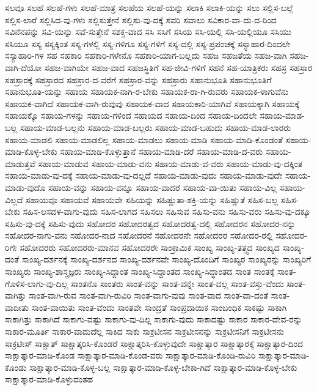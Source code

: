 {ಸಲವೂ
ಸಲಹೆ
ಸಲಹೆ-ಗಳು
ಸಲಹೆ-ಮಾತ್ರ
ಸಲಹೆಯ
ಸಲಹೆ-ಯನ್ನು
ಸಲಾಕಿ
ಸಲಾಕಿ-ಯನ್ನು
ಸಲು
ಸಲ್ಲಿಸ-ಬಲ್ಲೆ
ಸಲ್ಲಿಸ-ಲಾರೆ
ಸಲ್ಲಿಸಿದ-ವು-ಗಳು
ಸಲ್ಲಿಸುತ್ತೇನೆ
ಸಲ್ಲಿಸು-ವು-ದಕ್ಕೆ
ಸವರಿ
ಸವಾಲು
ಸವಿಕಾರ-ವಾ-ದು-ದ-ರಿಂದ
ಸವಿನೆನಪನ್ನು
ಸವಿ-ಯನ್ನು
ಸವೆ-ಸುತ್ತೇನೆ
ಸಶಕ್ತ-ವಾದ
ಸಸಿ
ಸಸಿಗೆ
ಸಸಿಯ
ಸಸಿ-ಯಲ್ಲಿ
ಸಸಿ-ಯಲ್ಲಿಯೂ
ಸಸಿಯು
ಸಸಿಯೂ
ಸಸ್ಯ
ಸಸ್ಯಕ್ಕಿಂತ
ಸಸ್ಯ-ಗಳಲ್ಲಿ
ಸಸ್ಯ-ಗಳಿಗೂ
ಸಸ್ಯ-ಗಳಿಗೆ
ಸಸ್ಯ-ದಲ್ಲಿ
ಸಸ್ಯ-ಪ್ರಪಂಚಕ್ಕೆ
ಸಸ್ಯಾಹಾರ-ದಿಂದಲೇ
ಸಸ್ಯಾಹಾರಿ-ಗಳ
ಸಹ
ಸಹಕಾರಿ
ಸಹಕಾರಿ-ಗಳೇನೊ
ಸಹಕಾರಿ-ಯಾಗ-ಬಲ್ಲದು
ಸಹಜ
ಸಹಜತೆಯ
ಸಹಜ-ವಾಗಿ
ಸಹಜ-ವಾಗಿ-ದೆಯೋ
ಸಹಜ-ವಾಗಿಯೇ
ಸಹಜ-ವಾದ
ಸಹಜಸ್ಥಿತಿಗೆ
ಸಹ-ಜೀವಿ-ಗಳಿಗೆ
ಸಹನೆ
ಸಹ-ಯಾತ್ರಿಕರು
ಸಹಸ್ರ
ಸಹಸ್ರಾರ
ಸಹಸ್ರಾರಕ್ಕೆ
ಸಹಸ್ರಾರದ
ಸಹಸ್ರಾರ-ದ-ವರೆಗೆ
ಸಹಸ್ರಾರ-ವನ್ನು
ಸಹಸ್ರಾರು
ಸಹಾನುಭೂತಿ
ಸಹಾನುಭೂತಿಗೆ
ಸಹಾನುಭೂತಿ-ಯನ್ನು
ಸಹಾಯ
ಸಹಾಯಕ-ನಾಗಿ-ರ-ಬೇಕು
ಸಹಾಯಕ-ರಾ-ಗಿ-ರುವರು
ಸಹಾಯಕ-ಳಾಗುವೆನು
ಸಹಾಯಕ-ವಾಗಿದೆ
ಸಹಾಯಕ-ವಾಗಿ-ರುವುವು
ಸಹಾಯಕ-ವಾದ
ಸಹಾಯಕಾರಿ-ಯಾಗಿವೆ
ಸಹಾಯಕ್ಕಾಗಿ
ಸಹಾಯಕ್ಕೆ
ಸಹಾಯಕ್ಕೊ
ಸಹಾಯ-ಗಳನ್ನು
ಸಹಾಯ-ಗಳಿಂದ
ಸಹಾಯದ
ಸಹಾಯ-ದಿಂದ
ಸಹಾಯ-ದಿಂದಲೇ
ಸಹಾಯ-ಮಾಡ-ಬಲ್ಲ
ಸಹಾಯ-ಮಾಡ-ಬಲ್ಲನು
ಸಹಾಯ-ಮಾಡ-ಬಲ್ಲರು
ಸಹಾಯ-ಮಾಡ-ಬಹುದು
ಸಹಾಯ-ಮಾಡ-ಲಾರರು
ಸಹಾಯ-ಮಾಡಲಿ
ಸಹಾಯ-ಮಾಡಲಿಲ್ಲ
ಸಹಾಯ-ಮಾಡಲು
ಸಹಾಯ-ಮಾಡಿ
ಸಹಾಯ-ಮಾಡಿ-ಕೊಂಡಂತೆ
ಸಹಾಯ-ಮಾಡಿ-ಕೊಳ್ಳ-ಬೇಕು
ಸಹಾಯ-ಮಾಡಿ-ಕೊಳ್ಳುತ್ತಾನೆ
ಸಹಾಯ-ಮಾಡಿ-ದರೆ
ಸಹಾಯ-ಮಾಡಿ-ದ-ವರು
ಸಹಾಯ-ಮಾಡುತ್ತವೆ
ಸಹಾಯ-ಮಾಡುವ
ಸಹಾಯ-ಮಾಡು-ವನು
ಸಹಾಯ-ಮಾಡು-ವ-ವರು
ಸಹಾಯ-ಮಾಡು-ವು-ದಕ್ಕಿಂತ
ಸಹಾಯ-ಮಾಡು-ವು-ದಕ್ಕೆ
ಸಹಾಯ-ಮಾಡು-ವು-ದಲ್ಲದೆ
ಸಹಾಯ-ಮಾಡು-ವುದು
ಸಹಾಯ-ಮಾಡು-ವುದೇ
ಸಹಾಯ-ಮಾಡು-ವುದೊ
ಸಹಾಯ-ವನ್ನು
ಸಹಾಯ-ವನ್ನೂ
ಸಹಾಯ-ವಾದರೆ
ಸಹಾಯ-ವಾ-ಯಿತು
ಸಹಾಯ-ವಿಲ್ಲ
ಸಹಾಯ-ವಿಲ್ಲದೆ
ಸಹಾಯವೂ
ಸಹಾಯವೆ
ಸಹಾಯವೇ
ಸಹಿಯನ್ನು
ಸಹಿಷ್ಣುತಾ-ಶಕ್ತಿ-ಯನ್ನು
ಸಹಿಷ್ಣುತೆ
ಸಹಿಸ-ಬಲ್ಲ
ಸಹಿಸ-ಬೇಕು
ಸಹಿಸ-ಲಸದಳ-ವಾಗು-ವುದು
ಸಹಿಸ-ಲಾಗದ
ಸಹಿಸಲು
ಸಹಿಸುವ
ಸಹಿಸು-ವನು
ಸಹಿಸು-ವರು
ಸಹಿಸು-ವು-ದಕ್ಕೂ
ಸಹಿಸು-ವು-ದಕ್ಕೆ
ಸಹಿಸು-ವುದು
ಸಹೋದರ
ಸಹೋದರತ್ವದ
ಸಹೋದರತ್ವ-ದಲ್ಲಿ
ಸಹೋದರನ
ಸಹೋದರ-ನನ್ನು
ಸಹೋದರ-ನಾಗು-ವನು
ಸಹೋದರ-ನಾದ
ಸಹೋದರನೆ
ಸಹೋದರನೇ
ಸಹೋದರರ
ಸಹೋದರ-ರಲ್ಲಿ
ಸಹೋದರ-ರಿಗೇ
ಸಹೋದರರು
ಸಹೋದರರು-ಮಾನವ
ಸಹೋದರರೇ
ಸಾಂಕ್ರಾಮಿಕ
ಸಾಂಖ್ಯ
ಸಾಂಖ್ಯ-ತತ್ತ್ವದ
ಸಾಂಖ್ಯದ
ಸಾಂಖ್ಯ-ದಂತೆ
ಸಾಂಖ್ಯ-ದರ್ಶನಕ್ಕೆ
ಸಾಂಖ್ಯ-ದರ್ಶನದ
ಸಾಂಖ್ಯ-ದರ್ಶನವೇ
ಸಾಂಖ್ಯ-ದೊಂದಿಗೆ
ಸಾಂಖ್ಯರ
ಸಾಂಖ್ಯರನ್ನು
ಸಾಂಖ್ಯರಿಗೆ
ಸಾಂಖ್ಯರು
ಸಾಂಖ್ಯ-ಶಾಸ್ತ್ರಜ್ಞರು
ಸಾಂಖ್ಯ-ಸಿದ್ದಾಂತ
ಸಾಂಖ್ಯ-ಸಿದ್ದಾಂತದ
ಸಾಂಖ್ಯ-ಸಿದ್ಧಾಂತದ
ಸಾಂತ
ಸಾಂತಕ್ಕೆ
ಸಾಂತ-ಗೊಳಿಸ-ಲಾಗು-ವು-ದಿಲ್ಲ
ಸಾಂತನೊ
ಸಾಂತರು
ಸಾಂತ-ವನ್ನು
ಸಾಂತ-ವನ್ನೇ
ಸಾಂತ-ವಲ್ಲ
ಸಾಂತ-ವಸ್ತು-ವೆಂದು
ಸಾಂತ-ವಾಗಿತ್ತು
ಸಾಂತ-ವಾಗಿ-ರುವ
ಸಾಂತ-ವಾಗಿ-ರುವಿರಿ
ಸಾಂತ-ವಾಗು-ವುವು
ಸಾಂತ-ವಾದ
ಸಾಂತ-ವಾ-ದಂತೆ
ಸಾಂತ-ವಾದೀತು
ಸಾಂತ-ವಾಯಿತು
ಸಾಂತ-ವೆಂದು
ಸಾಂತವೇ
ಸಾಂದ್ರತೆ
ಸಾಂಪ್ರದಾಯಿಕ
ಸಾಂಬಂಧಿಕ
ಸಾಕಷ್ಟು
ಸಾಕಾಗಿ
ಸಾಕಾಗಿತ್ತು
ಸಾಕಾಗಿದೆ
ಸಾಕಾಗು-ವಷ್ಟು
ಸಾಕಾಗು-ವು-ದಿಲ್ಲ
ಸಾಕಾಗು-ವುದು
ಸಾಕಾದಷ್ಟು
ಸಾಕಾರ
ಸಾಕಾರ-ದೇವ-ರನ್ನು
ಸಾಕಾರ-ಮೂರ್ತಿ
ಸಾಕಾರ-ವಾದುದೆಲ್ಲ
ಸಾಕಿದ
ಸಾಕು
ಸಾಕ್ರಟೀಸನ
ಸಾಕ್ರಟೀಸನನ್ನು
ಸಾಕ್ರಟೀಸನಿಗೆ
ಸಾಕ್ರಟೀಸನು
ಸಾಕ್ರಟೀಸ್
ಸಾಕ್ಷಾತ್
ಸಾಕ್ಷಾತ್ಕರಿಸಿ-ಕೊಂಡರೆ
ಸಾಕ್ಷಾತ್ಕರಿಸಿ-ಕೊಳ್ಳುವುದೇ
ಸಾಕ್ಷಾತ್ಕಾರ
ಸಾಕ್ಷಾತ್ಕಾರಕ್ಕೆ
ಸಾಕ್ಷಾತ್ಕಾರ-ದಿಂದ
ಸಾಕ್ಷಾತ್ಕಾರ-ಮಾಡಿ-ಕೊಂಡ
ಸಾಕ್ಷಾತ್ಕಾರ-ಮಾಡಿ-ಕೊಂಡ-ವರು
ಸಾಕ್ಷಾತ್ಕಾರ-ಮಾಡಿ-ಕೊಂಡಿ-ರುವಿರಿ
ಸಾಕ್ಷಾತ್ಕಾರ-ಮಾಡಿ-ಕೊಂಡು
ಸಾಕ್ಷಾತ್ಕಾರ-ಮಾಡಿ-ಕೊಳ್ಳ-ಬಲ್ಲ
ಸಾಕ್ಷಾತ್ಕಾರ-ಮಾಡಿ-ಕೊಳ್ಳ-ಬೇಕಾ-ಗಿದೆ
ಸಾಕ್ಷಾತ್ಕಾರ-ಮಾಡಿ-ಕೊಳ್ಳ-ಬೇಕು
ಸಾಕ್ಷಾತ್ಕಾರ-ಮಾಡಿ-ಕೊಳ್ಳುವಂತಹ
}

